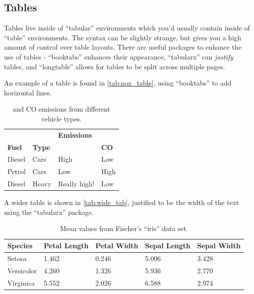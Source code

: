 \documentclass[a4paper]{article}
\newcommand{\nox}{\ce{NO_x}\xspace}
\begin{document}
\subsection{Tables} \label{ssec:table}

Tables live inside of ``tabular'' environments which you'd usually contain inside of ``table'' environments. The syntax can be slightly strange, but gives you a high amount of control over table layouts. There are useful packages to enhance the use of tables - ``booktabs'' enhances their appearance, ``tabularx'' can \textit{justify} tables, and ``longtable'' allows for tables to be split across multiple pages.

An example of a table is found in \autoref{tab:nox_table}, using ``booktabs'' to add horizontal lines.

\begin{table}[bht]
    \centering
    \begin{tabular}{l l l l}
    \toprule
                        &               & \multicolumn{2}{l}{\textbf{Emissions}} \\ \cmidrule(r){3-4}
         \textbf{Fuel}  & \textbf{Type} & \textbf{\nox} & \textbf{CO} \\
    \midrule
         Diesel & Cars & High & Low \\
         Petrol & Cars & Low & High \\
         Diesel & Heavy & Really high! & Low  \\
    \bottomrule
    \end{tabular}
    \caption{\nox and CO emissions from different vehicle types.}
    \label{tab:nox_table}
\end{table}

A wider table is shown in \autoref{tab:wide_tab}, justified to be the width of the text using the ``tabularx'' package.

\begin{table}[bht]
    \centering
    \begin{tabularx}{\linewidth}{lXXXX}
        \toprule
        \textbf{Species} & \textbf{Petal Length} & \textbf{Petal Width} & \textbf{Sepal Length} & \textbf{Sepal Width} \\ 
        \midrule
        Setosa & 1.462 & 0.246 & 5.006 & 3.428 \\ 
        Versicolor & 4.260 & 1.326 & 5.936 & 2.770 \\ 
        Virginica & 5.552 & 2.026 & 6.588 & 2.974 \\ 
        \bottomrule
    \end{tabularx}
    \caption{Mean values from Fischer's ``iris'' data set.}
    \label{tab:wide_tab}
\end{table}
\end{document}
